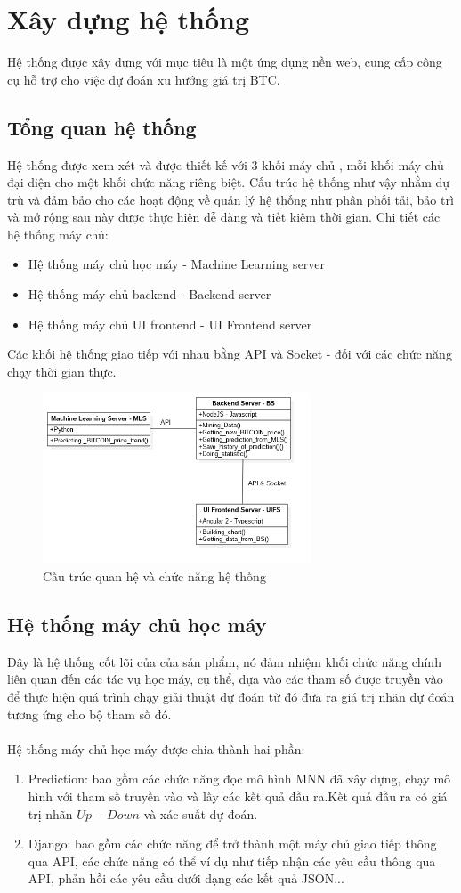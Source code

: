 \section{Xây dựng hệ thống}
Hệ thống được xây dựng với mục tiêu là một ứng dụng nền web, cung cấp công cụ hỗ 
trợ cho việc dự đoán xu hướng giá trị BTC.
\subsection{Tổng quan hệ thống}
Hệ thống được xem xét và được thiết kế với 3 khối máy chủ , mỗi khối máy chủ đại 
diện cho một khối chức năng riêng biệt. Cấu trúc hệ thống như vậy nhằm dự trù và đảm bảo 
cho các hoạt động về quản lý hệ thống như phân phối tải, bảo trì và mở rộng sau 
này được thực hiện dễ dàng và tiết kiệm thời gian. Chi tiết các hệ thống máy chủ:
\begin{itemize}
\item Hệ thống máy chủ học máy - Machine Learning server
\item Hệ thống máy chủ backend - Backend server
\item Hệ thống máy chủ UI frontend - UI Frontend server
\end{itemize}
Các khối hệ thống giao tiếp với nhau bằng API và Socket - đối với các chức năng
chạy thời gian thực.\\
\begin{figure}[h!]
\centering
\includegraphics[height=2in, keepaspectratio=true]{system.png}
\caption{Cấu trúc quan hệ và chức năng hệ thống}
\end{figure}
\subsection{Hệ thống máy chủ học máy}
Đây là hệ thống cốt lõi của của sản phẩm, nó đảm nhiệm khối chức năng chính 
liên quan đến các tác vụ học máy, cụ thể, dựa vào các tham số được truyền vào 
để thực hiện quá trình chạy giải thuật dự đoán từ đó đưa ra giá trị nhãn dự 
đoán tương ứng cho bộ tham số đó.\\\\
Hệ thống máy chủ học máy được chia thành hai phần:
\begin{enumerate}
\item Prediction: bao gồm các chức năng đọc mô hình MNN đã xây dựng, chạy mô 
hình với tham số truyền vào và lấy các kết quả đầu ra.Kết quả đầu ra có giá 
trị nhãn $Up-Down$ và xác suất dự đoán.
\item Django: bao gồm các chức năng để trở thành một máy chủ giao tiếp thông 
qua API, các chức năng có thể ví dụ như tiếp nhận các yêu cầu thông qua API, 
phản hồi các yêu cầu dưới dạng các kết quả JSON...
\end{enumerate}
